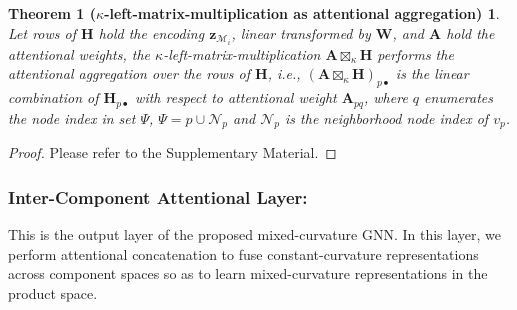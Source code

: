 \newtheorem*{thm}{Theorem 1 ($\kappa$-left-matrix-multiplication as attentional aggregation)}
\begin{thm}
Let rows of $\mathbf{H}$ hold the encoding $\boldsymbol z_{\mathcal M_i}$, linear transformed by $\mathbf{W}$, 
and $\mathbf{A}$ hold the attentional weights,
the  $\kappa$-left-matrix-multiplication $\mathbf{A} \boxtimes_{\kappa} \mathbf{H}$ performs the attentional aggregation over the rows of $\mathbf{H}$, i.e., 
$(\mathbf{A} \boxtimes_{\kappa} \mathbf{H})_{p \bullet}$ is the linear combination of $\mathbf{H}_{p\bullet}$ with respect to attentional weight $\mathbf{A}_{pq}$,
where $q$ enumerates the node index in set $\Psi$, $\Psi=p \cup \mathcal N_p$ and $\mathcal N_p$ is the neighborhood node index of $v_p$.
\end{thm}
\begin{proof}
Please refer to the Supplementary Material.
\end{proof}


\subsubsection{Inter-Component Attentional Layer:}
This is the output layer of the proposed mixed-curvature GNN.
In this layer, we perform attentional concatenation to fuse constant-curvature representations across component spaces so as to learn mixed-curvature representations in the product space.

